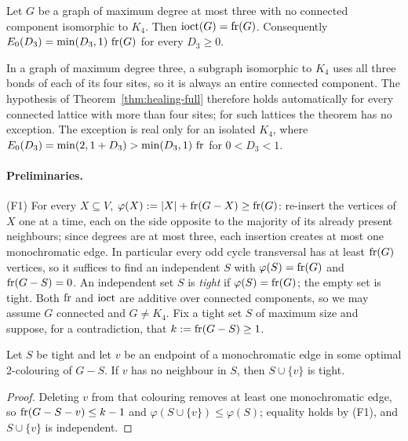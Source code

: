 
\begin{theorem}[healing]\label{thm:healing-full}
Let $G$ be a graph of maximum degree at most three with no connected component isomorphic to
$K_4$. Then $\operatorname{ioct}(G)=\operatorname{fr}(G)$. Consequently $E_0(D_3)=\min(D_3,1)\,\operatorname{fr}(G)$ for every $D_3\ge0$.
\end{theorem}

\begin{remark}\label{rem:K4}
In a graph of maximum degree three, a subgraph isomorphic to $K_4$ uses all three bonds of each
of its four sites, so it is always an entire connected component. The hypothesis of
Theorem~\ref{thm:healing-full} therefore holds automatically for every connected lattice with
more than four sites; for such lattices the theorem has no exception. The exception is real only
for an isolated $K_4$, where $E_0(D_3)=\min(2,1+D_3)>\min(D_3,1)\,\operatorname{fr}$ for $0<D_3<1$.
\end{remark}

\paragraph*{Preliminaries.}
(F1) For every $X\subseteq V$, $\varphi(X):=|X|+\operatorname{fr}(G-X)\ge\operatorname{fr}(G)$: re-insert the vertices of $X$
one at a time, each on the side opposite to the majority of its already present neighbours;
since degrees are at most three, each insertion creates at most one monochromatic edge.
In particular every odd cycle transversal has at least $\operatorname{fr}(G)$ vertices, so it suffices to
find an independent $S$ with $\varphi(S)=\operatorname{fr}(G)$ and $\operatorname{fr}(G-S)=0$.
An independent set $S$ is \emph{tight} if $\varphi(S)=\operatorname{fr}(G)$; the empty set is tight.
Both $\operatorname{fr}$ and $\operatorname{ioct}$ are additive over connected components, so we may assume $G$
connected and $G\ne K_4$. Fix a tight set $S$ of maximum size and suppose, for a
contradiction, that $k:=\operatorname{fr}(G-S)\ge1$.

\begin{lemma}[augmentation]\label{lem:aug}
Let $S$ be tight and let $v$ be an endpoint of a monochromatic edge in some optimal
2-colouring of $G-S$. If $v$ has no neighbour in $S$, then $S\cup\{v\}$ is tight.
\end{lemma}
\begin{proof}
Deleting $v$ from that colouring removes at least one monochromatic edge, so
$\operatorname{fr}(G-S-v)\le k-1$ and $\varphi(S\cup\{v\})\le\varphi(S)$; equality holds by (F1), and
$S\cup\{v\}$ is independent.
\end{proof}

